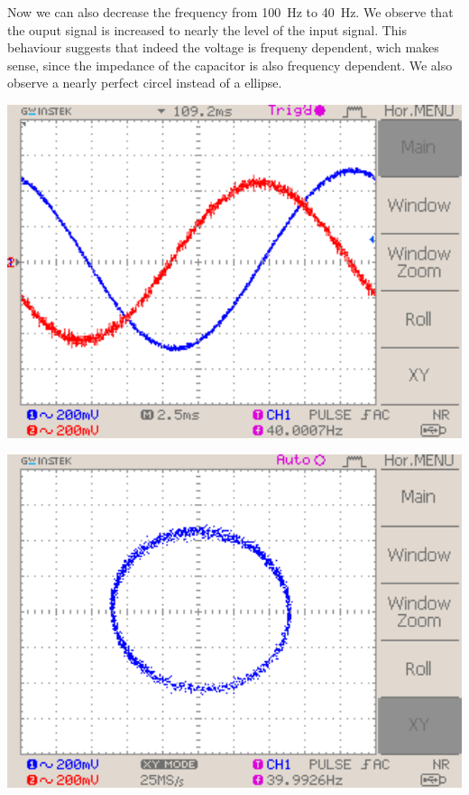 \documentclass[a4paper,10pt]{article}
\newenvironment{Figure}
        {\par\medskip\noindent\minipage{\linewidth}}
        {\endminipage\par\medskip}
\numberwithin{equation}{section}
\begin{document}
\begin{multicols}{2}
  Now we can also decrease the frequency from \SI{100}{Hz} to \SI{40}{Hz}. We observe that the ouput signal is increased to nearly the level of the input signal. This behaviour suggests that indeed the voltage is frequeny dependent, wich makes sense, since the impedance of the capacitor is also frequency dependent. We also observe a nearly perfect circel instead of a ellipse.
	\begin{Figure} 
		\centering
		\includegraphics[width=1\textwidth]{../data/DS0045_n.png}
		\label{fig:int12}
	\end{Figure}
	\begin{Figure}
		\centering
		\includegraphics[width=1\textwidth]{../data/DS0044_n.png}
		\label{fig:int13}
	\end{Figure}


\end{multicols}
\end{document}

